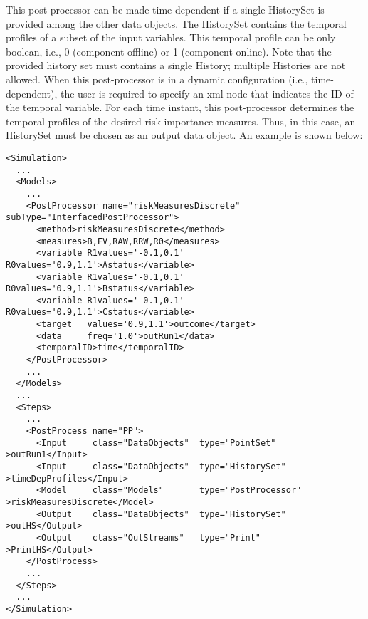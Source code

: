 This post-processor can be made time dependent if a single HistorySet is provided among the other data objects.
The HistorySet contains the temporal profiles of a subset of the input variables. This temporal profile can be only
boolean, i.e., 0 (component offline) or 1 (component online).
Note that the provided history set must contains a single History; multiple Histories are not allowed.
When this post-processor is in a dynamic configuration (i.e., time-dependent), the user is required to specify an xml
node  that indicates the ID of the temporal variable.
For each time instant, this post-processor determines the temporal profiles of the desired risk importance measures.
Thus, in this case, an HistorySet must be chosen as an output data object.
An example is shown below:
\begin{lstlisting}[style=XML,morekeywords={subType,debug,name,class,type}]
<Simulation>
  ...
  <Models>
    ...
    <PostProcessor name="riskMeasuresDiscrete" subType="InterfacedPostProcessor">
      <method>riskMeasuresDiscrete</method>
      <measures>B,FV,RAW,RRW,R0</measures>
      <variable R1values='-0.1,0.1' R0values='0.9,1.1'>Astatus</variable>
      <variable R1values='-0.1,0.1' R0values='0.9,1.1'>Bstatus</variable>
      <variable R1values='-0.1,0.1' R0values='0.9,1.1'>Cstatus</variable>
      <target   values='0.9,1.1'>outcome</target>
      <data     freq='1.0'>outRun1</data>
      <temporalID>time</temporalID>
    </PostProcessor>
    ...
  </Models>
  ...
  <Steps>
    ...
    <PostProcess name="PP">
      <Input     class="DataObjects"  type="PointSet"        >outRun1</Input>
      <Input     class="DataObjects"  type="HistorySet"      >timeDepProfiles</Input>
      <Model     class="Models"       type="PostProcessor"   >riskMeasuresDiscrete</Model>
      <Output    class="DataObjects"  type="HistorySet"      >outHS</Output>
      <Output    class="OutStreams"   type="Print"           >PrintHS</Output>
    </PostProcess>
    ...
  </Steps>
  ...
</Simulation>
\end{lstlisting}

%
%

